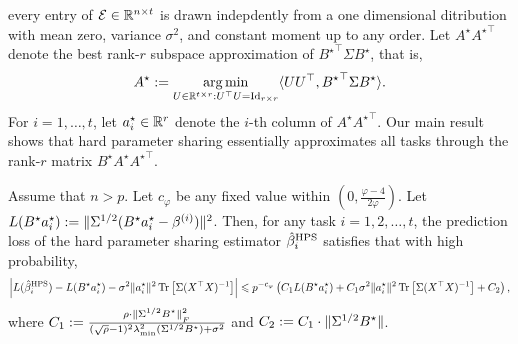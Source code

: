 every entry of $\mathcal{E} \in \mathbb{R}^{n \times t}$ is drawn indepdently from a one dimensional ditribution with mean zero, variance $\sigma^2$, and constant moment up to any order.
Let $A^{\star} {A^{\star}}^{\top}$ denote the best rank-$r$ subspace approximation of ${B^{\star}}^\top\Sigma B^{\star}$, that is,
\[ A^{\star} := \operatorname*{arg\,min}_{U\in\mathbb{R}^{t\times r} : U^{\top} U = \operatorname{Id}_{r\times r}} \langle U U^{\top}, {B^{\star}}^{\top} \Sigma B^{\star} \rangle. \]
For $i = 1,\dots, t$, let $a_i^{\star} \in\mathbb{R}^r$ denote the $i$-th column of $A^{\star}{A^{\star}}^{\top}$.
Our main result shows that hard parameter sharing essentially approximates all tasks through the rank-$r$ matrix $B^{\star} A^{\star} {A^{\star}}^{\top}$.

\begin{theorem}\label{thm_many_tasks}
	Assume that $n > p$.
	Let $c_{\varphi}$ be any fixed value within $(0, \frac{\varphi-4}{2\varphi})$.
	Let $L(B^{\star}a_i^{\star}): = \|\Sigma^{1/2} (B^{\star} a_i^{\star}- \beta^{(i)})\|^2$.
	Then, for any task $i = 1, 2, \dots, t$, the prediction loss of the hard parameter sharing estimator $\hat{\beta}_i^{\textup{HPS}}$ satisfies that with high probability,
	\begin{align*}
		{\left| {L(\hat{\beta}_i^{\textup{HPS}}) - L(B^{\star}a_i^{\star}) - \sigma^2 \|a_i^{\star}\|^2 \operatorname{Tr}\left[\Sigma (X^{\top}X)^{-1}\right]} \right|}
		\leqslant  p^{-c_{\varphi}}\left({C_1 L(B^{\star}a_i^{\star}) + C_1 \sigma^2 \|a_i^{\star}\|^2 \operatorname{Tr}\left[\Sigma (X^{\top}X)^{-1}\right] + C_2}\right),
	\end{align*}
	where $C_1: = \frac{\rho\cdot \|\Sigma^{1/2} B^{\star}\|_{_{F}}^2}{(\sqrt{\rho} - 1)^2\lambda_{\min}^2(\Sigma^{1/2} B^{\star}) + \sigma^2}$ and $C_2 :=  C_1\cdot \|\Sigma^{1/2} B^{\star}\|$.
\end{theorem}
